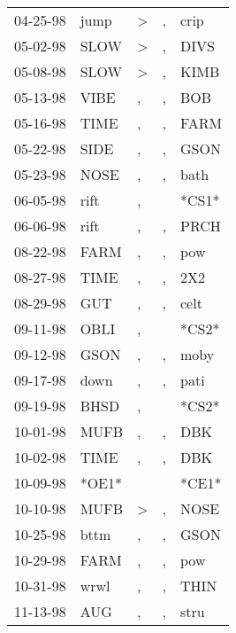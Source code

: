 \begin{supertabular}{lllll}
 04-25-98 &   jump &     \textgreater &                , &   crip \\
 05-02-98 &   SLOW &     \textgreater &                , &   DIVS \\
 05-08-98 &   SLOW &     \textgreater &                , &   KIMB \\
 05-13-98 &   VIBE &                , &                , &    BOB \\
 05-16-98 &   TIME &                , &                , &   FARM \\
 05-22-98 &   SIDE &                , &                , &   GSON \\
 05-23-98 &   NOSE &                , &                , &   bath \\
 06-05-98 &   rift &                , &                  &  *CS1* \\
 06-06-98 &   rift &                , &                , &   PRCH \\
 08-22-98 &   FARM &                , &                , &    pow \\
 08-27-98 &   TIME &                , &                , &    2X2 \\
 08-29-98 &    GUT &                , &                , &   celt \\
 09-11-98 &   OBLI &                , &                  &  *CS2* \\
 09-12-98 &   GSON &                , &                , &   moby \\
 09-17-98 &   down &                , &                , &   pati \\
 09-19-98 &   BHSD &                , &                  &  *CS2* \\
 10-01-98 &   MUFB &                , &                , &    DBK \\
 10-02-98 &   TIME &                , &                , &    DBK \\
 10-09-98 &  *OE1* &                  &                  &  *CE1* \\
 10-10-98 &   MUFB &     \textgreater &                , &   NOSE \\
 10-25-98 &   bttm &                , &                , &   GSON \\
 10-29-98 &   FARM &                , &                , &    pow \\
 10-31-98 &   wrwl &                , &                , &   THIN \\
 11-13-98 &    AUG &                , &                , &   stru \\

\end{supertabular}
